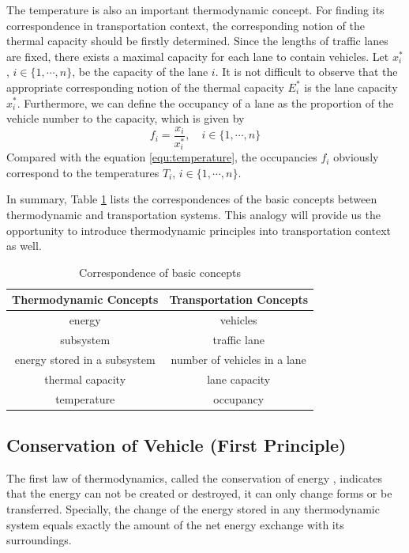 \documentclass[preprint,authoryear,12pt]{elsarticle}
\begin{document}
The temperature is also an important thermodynamic concept. For
finding its correspondence in transportation context, the
corresponding notion of the thermal capacity should be firstly
determined. Since the lengths of traffic lanes are fixed, there
exists a maximal capacity for each lane to contain vehicles. Let
$x_i^*$, $i\in\{1,\cdots,n\}$, be the capacity of the lane $i$. It is
not difficult to observe that the appropriate corresponding notion of
the thermal capacity $E_i^*$ is the lane capacity $x_i^*$.
Furthermore, we can define the occupancy of a lane as the proportion
of the vehicle number to the capacity, which is given by
\begin{equation}\label{equ:occupancy}
f_i = \frac{x_i}{x_i^*},\quad i\in\{1,\cdots,n\}
\end{equation}
Compared with the equation \eqref{equ:temperature}, the occupancies
$f_i$ obviously correspond to the temperatures $T_i$,
$i\in\{1,\cdots,n\}$.

In summary, Table \ref{tab:notions} lists the correspondences of the
basic concepts between thermodynamic and transportation systems. This
analogy will provide us the opportunity to introduce thermodynamic
principles into transportation context as well.

\begin{table}[ht]
\centering \caption{Correspondence of basic concepts}
\label{tab:notions}
\begin{tabular}{cc}
  \hline
  Thermodynamic Concepts & Transportation Concepts \\
  \hline
  energy & vehicles \\
  subsystem & traffic lane \\
  energy stored in a subsystem & number of vehicles in a lane \\
  thermal capacity & lane capacity \\
  temperature & occupancy \\
  \hline
\end{tabular}
\end{table}

\subsection{Conservation of Vehicle (First Principle)}

The first law of thermodynamics, called the conservation of energy
\citep{cengel_thermodynamics:_2001}, indicates that the energy can
not be created or destroyed, it can only change forms or be
transferred. Specially, the change of the energy stored in any
thermodynamic system equals exactly the amount of the net energy
exchange with its surroundings.
\end{document}
